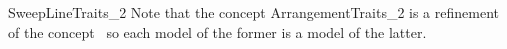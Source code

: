 \begin{ccRefConcept}{SweepLineTraits_2}
  Note that the concept ArrangementTraits\_2 is a refinement of the 
  concept \ccRefName\ so each model of the former is a model of the latter.

\ccSeeAlso







\end{ccRefConcept}


